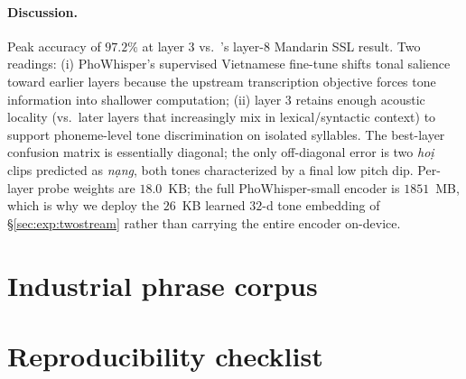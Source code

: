 \documentclass[a4paper,fleqn]{cas-dc}
\begin{document}
\paragraph{Discussion.} Peak accuracy of $97.2\%$ at layer $3$ vs.\ \citet{delafuente2024tone}'s layer-$8$ Mandarin SSL result. Two readings: (i) PhoWhisper's supervised Vietnamese fine-tune shifts tonal salience toward earlier layers because the upstream transcription objective forces tone information into shallower computation; (ii) layer $3$ retains enough acoustic locality (vs.\ later layers that increasingly mix in lexical/syntactic context) to support phoneme-level tone discrimination on isolated syllables. The best-layer confusion matrix is essentially diagonal; the only off-diagonal error is two \emph{ho{\d{i}}} clips predicted as \emph{n{\d{a}}ng}, both tones characterized by a final low pitch dip. Per-layer probe weights are $18.0$~KB; the full PhoWhisper-small encoder is $1851$~MB, which is why we deploy the $26$~KB learned $32$-d tone embedding of \S\ref{sec:exp:twostream} rather than carrying the entire encoder on-device.

\section{Industrial phrase corpus}\label{app:phrases}
\section{Reproducibility checklist}\label{app:repro}

\printcredits




\end{document}
